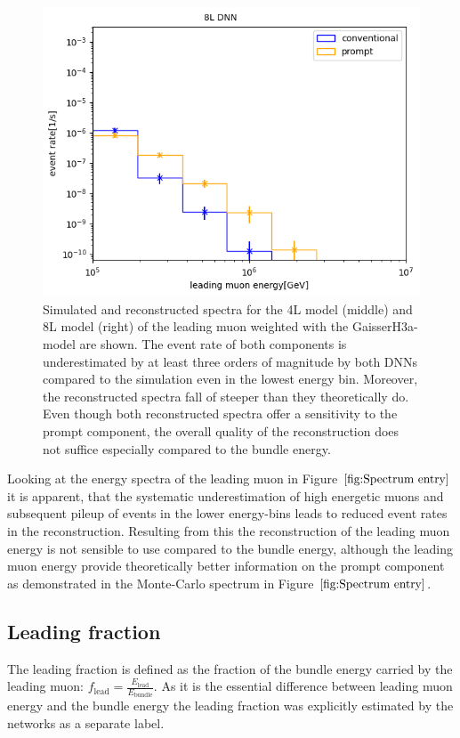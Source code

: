 \documentclass[
  tucolor,       %
  BCOR=12mm,     %
  parskip=half,  %
  open=any,      %
  cleardoublepage=plain,  %
]{tudothesis}
\begin{document}
\begin{figure}
\begin{minipage}[t]{0.32\textwidth}
    \includegraphics[width=\textwidth]{Plots/muon flux std dnn entry}
  \end{minipage}
  \caption{Simulated and reconstructed spectra for the 4L model (middle) and 8L model (right) of the leading muon weighted with the GaisserH3a-model are shown. The event rate of both components is underestimated by at least three orders of magnitude by both DNNs compared to the simulation even in the lowest energy bin. Moreover, the reconstructed spectra fall of steeper than they theoretically do. Even though both reconstructed spectra offer a sensitivity to the prompt component, the overall quality of the reconstruction does not suffice especially compared to the bundle energy.}
  \label{fig:Spectrum entry}
\end{figure}
Looking at the energy spectra of the leading muon in Figure $\ref{fig:Spectrum entry}$ it is apparent, that the systematic underestimation of high energetic muons and subsequent pileup of events in the lower energy-bins leads to reduced event rates in the reconstruction.
Resulting from this the reconstruction of the leading muon energy is not sensible to use compared to the bundle energy, although the leading muon energy provide theoretically better information on the prompt component as demonstrated in the Monte-Carlo spectrum in Figure $\ref{fig:Spectrum entry}$.
\subsection{Leading fraction}
The leading fraction is defined as the fraction of the bundle energy carried by the leading muon: $f_{\mathrm{lead}}=\frac{E_{\mathrm{lead}}}{E_{\mathrm{bundle}}}$.
As it is the essential difference between leading muon energy and the bundle energy the leading fraction was explicitly estimated by the networks as a separate label.
\end{document}
